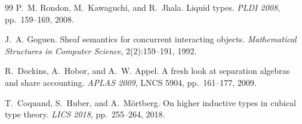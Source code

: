 \documentclass[11pt]{article}
\begin{document}
\begin{thebibliography}{99}
P.~M. Rondon, M.~Kawaguchi, and R.~Jhala.
\newblock Liquid types.
\newblock \emph{PLDI 2008}, pp.\ 159--169, 2008.

J.~A. Goguen.
\newblock Sheaf semantics for concurrent interacting objects.
\newblock \emph{Mathematical Structures in Computer Science},
  2(2):159--191, 1992.

R.~Dockins, A.~Hobor, and A.~W. Appel.
\newblock A fresh look at separation algebras and share accounting.
\newblock \emph{APLAS 2009}, LNCS 5904, pp.\ 161--177, 2009.

T.~Coquand, S.~Huber, and A.~M\"ortberg.
\newblock On higher inductive types in cubical type theory.
\newblock \emph{LICS 2018}, pp.\ 255--264, 2018.

\end{thebibliography}
\end{document}
